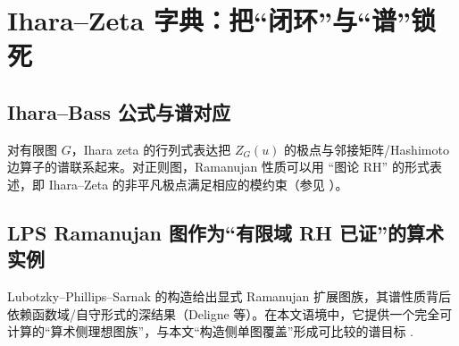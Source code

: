 \section{Ihara--Zeta 字典：把“闭环”与“谱”锁死}\label{sec:ihara}

\subsection{Ihara--Bass 公式与谱对应}
对有限图 $G$，Ihara zeta 的行列式表达把 $Z_G(u)$ 的极点与邻接矩阵/Hashimoto 边算子的谱联系起来。对正则图，Ramanujan 性质可以用 ``图论 RH'' 的形式表述，即 Ihara--Zeta 的非平凡极点满足相应的模约束（参见 \cite{ihara1966zeta,bass1992ihara,terrass2010zeta}）。

\subsection{LPS Ramanujan 图作为“有限域 RH 已证”的算术实例}
Lubotzky--Phillips--Sarnak 的构造给出显式 Ramanujan 扩展图族，其谱性质背后依赖函数域/自守形式的深结果（Deligne 等）。在本文语境中，它提供一个完全可计算的“算术侧理想图族”，与本文“构造侧单图覆盖”形成可比较的谱目标 \cite{lps1988ramanujan}.

